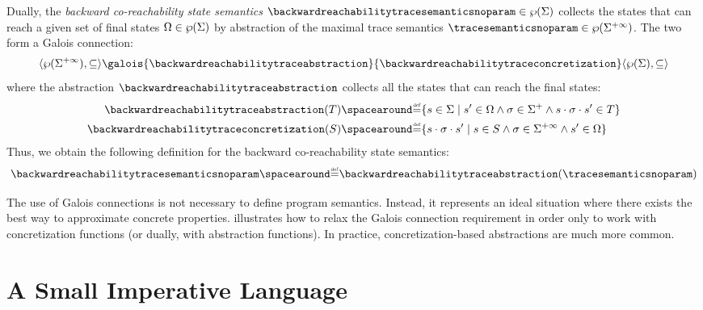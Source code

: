 \begin{example}
  Dually, the \emph{backward co-reachability state semantics} $\backwardreachabilitytracesemanticsnoparam\in\backwardreachabilitytracetype$ collects the states that can reach a given set of final states $\Omega\in\wp(\Sigma)$ by abstraction of the maximal trace semantics $\tracesemanticsnoparam\in\tracetype$. The two form a Galois connection:
  \begin{align*}
    \tuple{\tracetype}{\tracesubseteq}\galois{\backwardreachabilitytraceabstraction}{\backwardreachabilitytraceconcretization}\tuple{\backwardreachabilitytracetype}{\backwardreachabilitytracesubseteq}
  \end{align*}
  where the abstraction $\backwardreachabilitytraceabstraction$ collects all the states that can reach the final states:
  \begin{align*}
    \backwardreachabilitytraceabstraction(\defsetoftraces) &\DefeQ \setdef{\defstate\in\state}{ \defstate'\in\finalstates \land \deftrace\in\finitesequences \land \concat{\concat{\defstate}{\deftrace}}{{\defstate'}} \in \defsetoftraces} \\
    \backwardreachabilitytraceconcretization(\defsetofstates) &\DefeQ \setdef{\concat{\concat{\defstate}{\deftrace}}{{\defstate'}}}{\defstate\in\defsetofstates \land \deftrace\in\finiteinfinitesequences \land \defstate' \in \finalstates}
  \end{align*}
Thus, we obtain the following definition for the backward co-reachability state semantics:
\[ \backwardreachabilitytracesemanticsnoparam \DefeQ \backwardreachabilitytraceabstraction(\tracesemanticsnoparam) \]

\end{example}

\begin{remark}
  The use of Galois connections is not necessary to define program semantics. Instead, it represents an ideal situation where there exists the best way to approximate concrete properties.  illustrates how to relax the Galois connection requirement in order only to work with concretization functions (or dually, with abstraction functions). In practice, concretization-based abstractions are much more common.
\end{remark}


\section{A Small Imperative Language}

